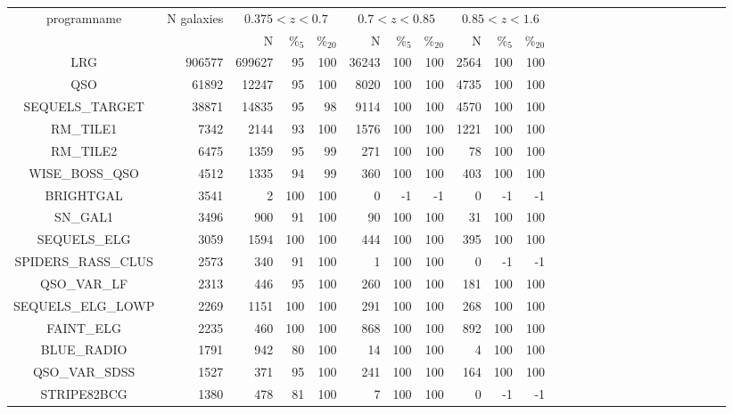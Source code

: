 \documentclass[onecolumn]{aa}
\begin{document}
\begin{center}
\begin{longtable}{c r rrrr rrrr rrrrr rrrrr rrrrr}
\hline \hline
programname        & N galaxies   &   \multicolumn{3}{c}{$0.375<z<0.7$}        &  \multicolumn{3}{c}{$0.7<z<0.85$}        &  \multicolumn{3}{c}{$0.85<z<1.6$} \\
       		&          & N        & \%$_{5}$        & \%$_{20}$        & N        & \%$_{5}$        & \%$_{20}$         & N        & \%$_{5}$        & \%$_{20}$       \\
\hline
LRG                      & 906577 & 699627 & 95  & 100 & 36243 & 100 & 100  & 2564 & 100 & 100 \\ 
QSO                      & 61892  & 12247  & 95  & 100 & 8020  & 100 & 100  & 4735 & 100 & 100 \\ 
SEQUELS\_TARGET          & 38871  & 14835  & 95  & 98  & 9114  & 100 & 100  & 4570 & 100 & 100 \\ 
RM\_TILE1                & 7342   & 2144   & 93  & 100 & 1576  & 100 & 100  & 1221 & 100 & 100 \\ 
RM\_TILE2                & 6475   & 1359   & 95  & 99  & 271   & 100 & 100  & 78 & 100 & 100 \\ 
WISE\_BOSS\_QSO          & 4512   & 1335   & 94  & 99  & 360   & 100 & 100  & 403 & 100 & 100 \\ 
BRIGHTGAL                & 3541   & 2      & 100 & 100 & 0     & -1  & -1   & 0 & -1  & -1 \\ 
SN\_GAL1                 & 3496   & 900    & 91  & 100 & 90    & 100 & 100  & 31 & 100 & 100 \\ 
SEQUELS\_ELG             & 3059   & 1594   & 100 & 100 & 444   & 100 & 100  & 395 & 100 & 100 \\ 
SPIDERS\_RASS\_CLUS      & 2573   & 340    & 91  & 100 & 1     & 100 & 100  & 0 & -1  & -1 \\ 
QSO\_VAR\_LF             & 2313   & 446    & 95  & 100 & 260   & 100 & 100  & 181 & 100 & 100 \\ 
SEQUELS\_ELG\_LOWP       & 2269   & 1151   & 100 & 100 & 291   & 100 & 100  & 268 & 100 & 100 \\ 
FAINT\_ELG               & 2235   & 460    & 100 & 100 & 868   & 100 & 100  & 892 & 100 & 100 \\ 
BLUE\_RADIO              & 1791   & 942    & 80  & 100 & 14    & 100 & 100  & 4 & 100 & 100 \\ 
QSO\_VAR\_SDSS           & 1527   & 371    & 95  & 100 & 241   & 100 & 100  & 164 & 100 & 100 \\ 
STRIPE82BCG              & 1380   & 478    & 81  & 100 & 7     & 100 & 100  & 0 & -1  & -1 \\ 

\end{longtable}
\end{center}
\end{document}
